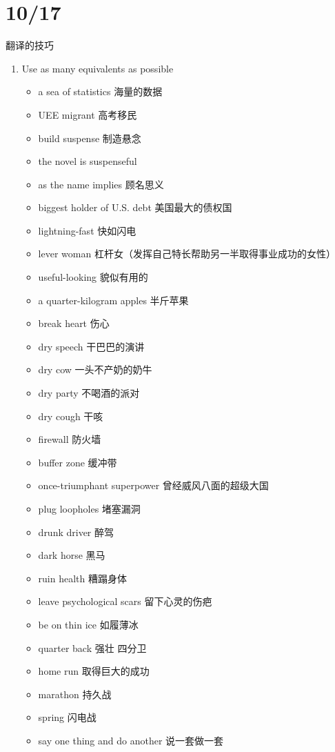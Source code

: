 \documentclass{ctexart}
\begin{document}
\section{10/17}
翻译的技巧
\begin{enumerate}
  \item Use as many equivalents as possible
    \begin{itemize}
      \item a sea of statistics 海量的数据
      \item UEE migrant 高考移民
      \item build suspense 制造悬念
      \item the novel is suspenseful
      \item as the name implies 顾名思义
      \item biggest holder of U.S. debt 美国最大的债权国
      \item lightning-fast 快如闪电
      \item lever woman 杠杆女（发挥自己特长帮助另一半取得事业成功的女性）
      \item useful-looking 貌似有用的
      \item a quarter-kilogram apples 半斤苹果
      \item break heart 伤心
      \item dry speech 干巴巴的演讲
      \item dry cow 一头不产奶的奶牛
      \item dry party 不喝酒的派对
      \item dry cough 干咳
      \item firewall 防火墙
      \item buffer zone 缓冲带
      \item once-triumphant superpower 曾经威风八面的超级大国
      \item plug loopholes 堵塞漏洞
      \item drunk driver 醉驾
      \item dark horse 黑马
      \item ruin health 糟蹋身体
      \item leave psychological scars 留下心灵的伤疤
      \item be on thin ice 如履薄冰
      \item quarter back 强壮 四分卫
      \item home run 取得巨大的成功
      \item marathon 持久战
      \item spring 闪电战
      \item say one thing and do another 说一套做一套

\end{itemize}
\end{enumerate}
\end{document}
